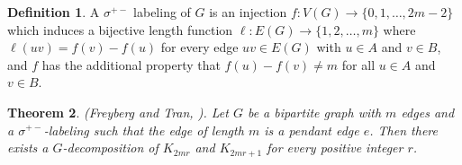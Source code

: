 \documentclass[addpoints,11pt]{exam}
\newtheorem{theorem}{Theorem}[section]
\theoremstyle{definition}
\newtheorem{definition}[theorem]{Definition}
\begin{document}
\begin{definition}\label{sigmapm}
  \cite{sigma} A $\sigma^{+-}$ labeling of $G$ is an injection $f:V(G) \rightarrow \{0, 1,\hdots, 2m-2\}$ which induces a bijective length function $\ell:E(G)\rightarrow \{1, 2,\hdots, m\}$ where $\ell(uv) = f(v)-f(u)$ for every edge $uv\in E(G)$ with $u\in A$ and $v\in B$, and $f$ has the additional property that $f(u)-f(v) \neq m$ for all $u\in A$ and $v\in B$.
\end{definition}

\begin{theorem}\label{sigmadec}
  (Freyberg and Tran, \cite{sigma}). Let $G$ be a bipartite graph with $m$ edges and a $\sigma^{+-}$-labeling such that the edge of length $m$ is a pendant edge $e$. Then there exists a $G$-decomposition of $K_{2mr}$ and $K_{2mr+1}$ for every positive integer $r$.
\end{theorem}
\end{document}
